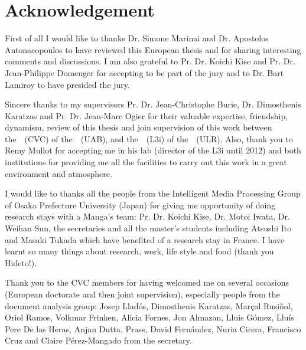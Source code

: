 \chapter*{Acknowledgement}

First of all I would like to thanks Dr. Simone Marinai and Dr. Apostolos Antonacopoulos to have reviewed this European thesis and for sharing interesting comments and discussions.
I am also grateful to Pr. Dr. Koichi Kise and Pr. Dr. Jean-Philippe Domenger for accepting to be part of the jury and to Dr. Bart Lamiroy to have presided the jury.

Sincere thanks to my supervisors Pr. Dr. Jean-Christophe Burie, Dr. Dimosthenis Karatzas and Pr. Dr. Jean-Marc Ogier for their valuable expertise, friendship, dynamism, review of this thesis and join supervision of this work between the~\CVC~(CVC) of the~\UAB~(UAB), and the~\LIII~(L3i) of the~\ULR~(ULR).
Also, thank you to Remy Mullot for accepting me in his lab (director of the L3i until 2012) and both institutions for providing me all the facilities to carry out this work in a great environment and atmosphere.

I would like to thanks all the people from the Intelligent Media Processing Group of Osaka Prefecture University (Japan) for giving me opportunity of doing research stays with a Manga's team: Pr. Dr. Koichi Kise, Dr. Motoi Iwata, Dr. Weihan Sun, the secretaries and all the master's students including Atsushi Ito and Masaki Tukada which have benefited of a research stay in France.
I have learnt so many things about research, work, life style and food (thank you Hideto!).

Thank you to the CVC members for having welcomed me on several occasions (European doctorate and then joint supervision), especially people from the document analysis group: Josep Llad\'{o}s, Dimosthenis Karatzas, Marçal Rusiñol, Oriol Ramos, Volkmar Frinken, Alicia Fornes, Jon Almazan, Lluis G\'{o}mez, Llu\'{i}s Pere De las Heras, Anjan Dutta, Prass, David Fern\'{a}ndez, Nuria Cirera, Francisco Cruz and Claire Pérez-Mangado from the secretary.
\\

